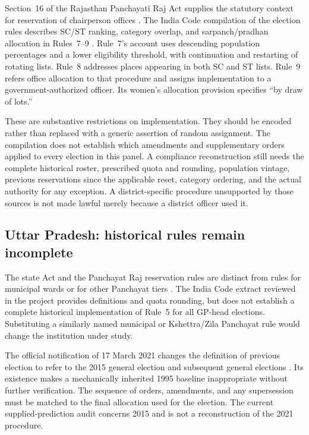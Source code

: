Section~16 of the Rajasthan Panchayati Raj Act supplies the statutory context
for reservation of chairperson offices \citep{rajasthanact}. The India Code
compilation of the election rules describes SC/ST ranking, category overlap,
and sarpanch/pradhan allocation in Rules~7--9 \citep{rajasthanrules}.
Rule~7's account uses descending population percentages and a lower eligibility
threshold, with continuation and restarting of rotating lists. Rule~8 addresses
places appearing in both SC and ST lists. Rule~9 refers office allocation to
that procedure and assigns implementation to a government-authorized officer.
Its women's allocation provision specifies ``by draw of lots.''

These are substantive restrictions on implementation. They should be encoded
rather than replaced with a generic assertion of random assignment. The
compilation does not establish which amendments and supplementary orders applied
to every election in this panel. A compliance reconstruction still needs the
complete historical roster, prescribed quota and rounding, population vintage,
previous reservations since the applicable reset, category ordering, and the
actual authority for any exception. A district-specific procedure unsupported
by those sources is not made lawful merely because a district officer used it.

\subsection{Uttar Pradesh: historical rules remain incomplete}

The state Act and the Panchayat Raj reservation rules are distinct from rules
for municipal wards or for other Panchayat tiers \citep{upact,uprules}.
The India Code extract reviewed in the project provides definitions and quota
rounding, but does not establish a complete historical implementation of
Rule~5 for all GP-head elections. Substituting a similarly named municipal or
Kshettra/Zila Panchayat rule would change the institution under study.

The official notification of 17 March 2021 changes the definition of previous
election to refer to the 2015 general election and subsequent general elections
\citep{up2021}. Its existence makes a mechanically inherited 1995 baseline
inappropriate without further verification. The sequence of orders, amendments,
and any supersession must be matched to the final allocation used for the
election. The current supplied-prediction audit concerns 2015 and is not a
reconstruction of the 2021 procedure.

